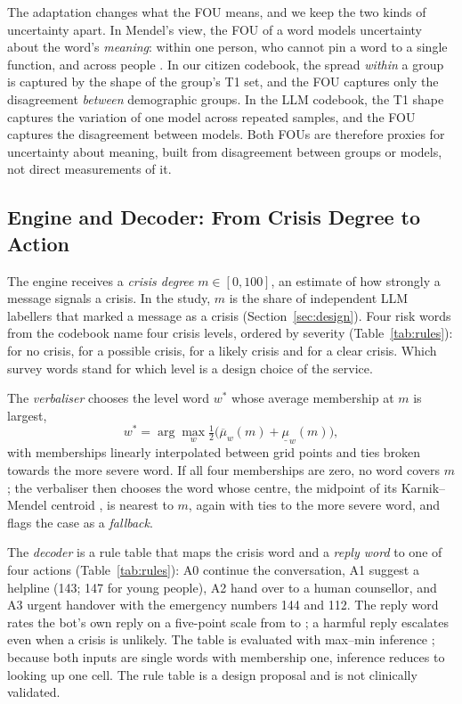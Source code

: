 The adaptation changes what the FOU means, and we keep the two kinds of uncertainty apart.
In Mendel's view, the FOU of a word models uncertainty about the word's \emph{meaning}: within one person, who cannot
pin a word to a single function, and across people \citep{mendel2007computing}.
In our citizen codebook, the spread \emph{within} a group is captured by the shape of the group's T1 set, and the FOU
captures only the disagreement \emph{between} demographic groups.
In the LLM codebook, the T1 shape captures the variation of one model across repeated samples, and the FOU captures the
disagreement between models.
Both FOUs are therefore proxies for uncertainty about meaning, built from disagreement between groups or models, not
direct measurements of it.

\subsection{Engine and Decoder: From Crisis Degree to Action}
\label{sec:concept-decoder}

The engine receives a \emph{crisis degree} $m \in [0, 100]$, an estimate of how strongly a message signals a crisis.
In the study, $m$ is the share of independent LLM labellers that marked a message as a crisis
(Section~\ref{sec:design}).
Four risk words from the codebook name four crisis levels, ordered by severity
(Table~\ref{tab:rules}):  for no crisis,  for a possible crisis,
 for a likely crisis and  for a clear crisis.
Which survey words stand for which level is a design choice of the service.

The \emph{verbaliser} chooses the level word $w^\ast$ whose average membership at $m$ is largest,
\begin{equation}
w^\ast = \arg\max_{w} \tfrac{1}{2}\bigl(\overline{\mu}_w(m) + \underline{\mu}_w(m)\bigr),
\label{eq:verbalise}
\end{equation}
with memberships linearly interpolated between grid points and ties broken towards the more severe word.
If all four memberships are zero, no word covers $m$; the verbaliser then chooses the word whose centre, the midpoint
of its Karnik--Mendel centroid \citep{karnik2001centroid,wu2009ekm}, is nearest to $m$, again with ties to the more
severe word, and flags the case as a \emph{fallback}.

The \emph{decoder} is a rule table that maps the crisis word and a \emph{reply word} to one of four actions
(Table~\ref{tab:rules}): A0 continue the conversation, A1 suggest a helpline (143; 147 for young people), A2 hand over
to a human counsellor, and A3 urgent handover with the emergency numbers 144 and 112.
The reply word rates the bot's own reply on a five-point scale from  to
; a harmful reply escalates even when a crisis is unlikely.
The table is evaluated with max--min inference \citep{mendel2010perceptual}; because both inputs are single words with
membership one, inference reduces to looking up one cell.
The rule table is a design proposal and is not clinically validated.

